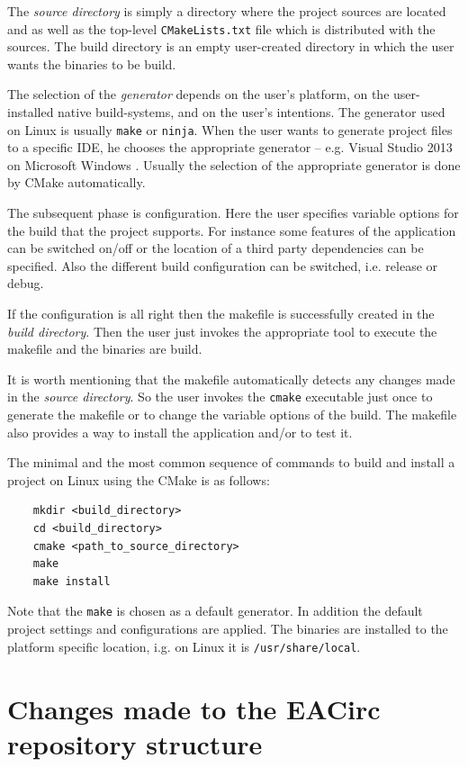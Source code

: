 \documentclass[12pt,oneside]{fithesis2}
\begin{document}
The \emph{source directory} is simply a directory where the project sources are located and as well as the top-level \texttt{CMakeLists.txt} file which is distributed with the sources. The build directory is an empty user-created directory in which the user wants the binaries to be build.

The selection of the \emph{generator} depends on the user's platform, on the user-installed native build-systems, and on the user's intentions. The generator used on Linux is usually \texttt{make} or \texttt{ninja}. When the user wants to generate project files to a specific IDE, he chooses the appropriate generator -- e.g. Visual Studio 2013 \cite{msvc} on Microsoft Windows \cite{win}. Usually the selection of the appropriate generator is done by CMake automatically.

The subsequent phase is configuration. Here the user specifies variable options for the build that the project supports. For instance some features of the application can be switched on/off or the location of a third party dependencies can be specified. Also the different build configuration can be switched, i.e. release or debug.

If the configuration is all right then the makefile is successfully created in the \emph{build directory}. Then the user just invokes the appropriate tool to execute the makefile and the binaries are build.

It is worth mentioning that the makefile automatically detects any changes made in the \emph{source directory}. So the user invokes the \texttt{cmake} executable just once to generate the makefile or to change the variable options of the build. The makefile also provides a way to install the application and/or to test it.

The minimal and the most common sequence of commands to build and install a project on Linux using the CMake is as follows:
	\begin{verbatim}
	mkdir <build_directory>
	cd <build_directory>
	cmake <path_to_source_directory>
	make
	make install
	\end{verbatim}
Note that the \texttt{make} is chosen as a default generator. In addition the default project settings and configurations are applied. The binaries are installed to the platform specific location, i.g. on Linux it is \texttt{/usr/share/local}.

\section{Changes made to the EACirc repository structure}
\end{document}
